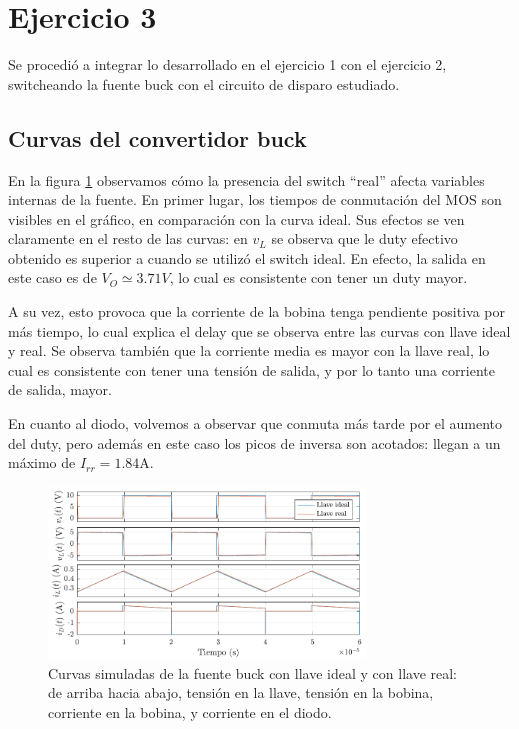 \documentclass[e4_tp1_main.tex]{subfiles}
\begin{document}
\section{Ejercicio 3}

Se procedi\'o a integrar lo desarrollado en el ejercicio 1 con el ejercicio 2, switcheando la fuente buck con el circuito de disparo estudiado. 

\subsection{Curvas del convertidor buck}

En la figura \ref{fig:curvas3} observamos c\'omo la presencia del switch ``real'' afecta variables internas de la fuente. En primer lugar, los tiempos de conmutaci\'on del MOS son visibles en el gr\'afico, en comparaci\'on con la curva ideal. Sus efectos se ven claramente en el resto de las curvas: en $v_L$ se observa que le duty efectivo obtenido es superior a cuando se utiliz\'o el switch ideal. En efecto, la salida en este caso es de $V_O\simeq3.71V$, lo cual es consistente con tener un duty mayor.

A su vez, esto provoca que la corriente de la bobina tenga pendiente positiva por m\'as tiempo, lo cual explica el delay que se observa entre las curvas con llave ideal y real. Se observa tambi\'en que la corriente media es mayor con la llave real, lo cual es consistente con tener una tensi\'on de salida, y por lo tanto una corriente de salida, mayor.

En cuanto al diodo, volvemos a observar que conmuta m\'as tarde por el aumento del duty, pero adem\'as en este caso los picos de inversa son acotados: llegan a un m\'aximo de $I_{rr}=1.84$A.

\begin{figure}[ht]
	\centering
	\includegraphics[width=0.75\textwidth]{images/ej3/curvas3.pdf}
	\caption{Curvas simuladas de la fuente buck con llave ideal y con llave real: de arriba hacia abajo, tensi\'on en la llave, tensi\'on en la bobina, corriente en la bobina, y corriente en el diodo.}
	\label{fig:curvas3}
\end{figure}
\end{document}
